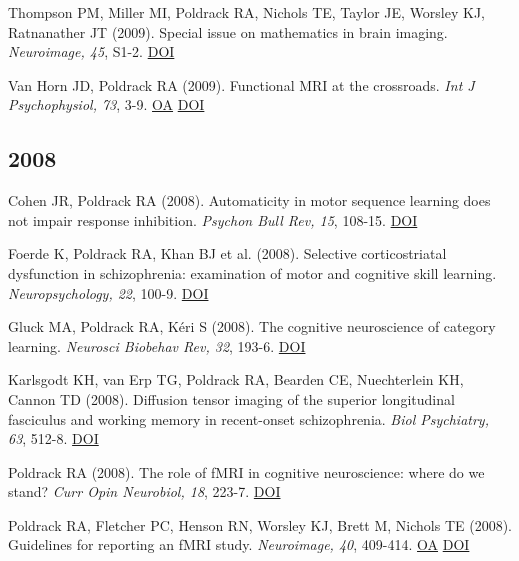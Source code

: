 \documentclass[10pt, letterpaper]{article}
\begin{document}
Thompson PM, Miller MI, Poldrack RA, Nichols TE, Taylor JE, Worsley KJ, Ratnanather JT (2009). Special issue on mathematics in brain imaging. \textit{Neuroimage, 45}, S1-2. \href{http://dx.doi.org/10.1016/j.neuroimage.2008.10.033}{DOI} \vspace{2mm}

Van Horn JD, Poldrack RA (2009). Functional MRI at the crossroads. \textit{Int J Psychophysiol, 73}, 3-9. \href{https://www.ncbi.nlm.nih.gov/pmc/articles/PMC2747289}{OA} \href{http://dx.doi.org/10.1016/j.ijpsycho.2008.11.003}{DOI} \vspace{2mm}

\subsection*{2008}Cohen JR, Poldrack RA (2008). Automaticity in motor sequence learning does not impair response inhibition. \textit{Psychon Bull Rev, 15}, 108-15. \href{http://dx.doi.org/10.3758/pbr.15.1.108}{DOI} \vspace{2mm}

Foerde K, Poldrack RA, Khan BJ et al. (2008). Selective corticostriatal dysfunction in schizophrenia: examination of motor and cognitive skill learning. \textit{Neuropsychology, 22}, 100-9. \href{http://dx.doi.org/10.1037/0894-4105.22.1.100}{DOI} \vspace{2mm}

Gluck MA, Poldrack RA, Kéri S (2008). The cognitive neuroscience of category learning. \textit{Neurosci Biobehav Rev, 32}, 193-6. \href{http://dx.doi.org/10.1016/j.neubiorev.2007.11.002}{DOI} \vspace{2mm}

Karlsgodt KH, van Erp TG, Poldrack RA, Bearden CE, Nuechterlein KH, Cannon TD (2008). Diffusion tensor imaging of the superior longitudinal fasciculus and working memory in recent-onset schizophrenia. \textit{Biol Psychiatry, 63}, 512-8. \href{http://dx.doi.org/10.1016/j.biopsych.2007.06.017}{DOI} \vspace{2mm}

Poldrack RA (2008). The role of fMRI in cognitive neuroscience: where do we stand? \textit{Curr Opin Neurobiol, 18}, 223-7. \href{http://dx.doi.org/10.1016/j.conb.2008.07.006}{DOI} \vspace{2mm}

Poldrack RA, Fletcher PC, Henson RN, Worsley KJ, Brett M, Nichols TE (2008). Guidelines for reporting an fMRI study. \textit{Neuroimage, 40}, 409-414. \href{https://www.ncbi.nlm.nih.gov/pmc/articles/PMC2287206}{OA} \href{http://dx.doi.org/10.1016/j.neuroimage.2007.11.048}{DOI} \vspace{2mm}
\end{document}
